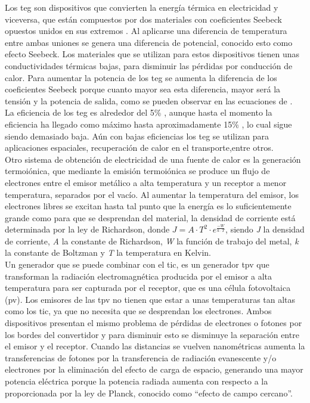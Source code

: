 Los \acrshort{teg} son dispositivos que convierten la energía térmica en electricidad y viceversa, que están compuestos por dos materiales con coeficientes Seebeck opuestos unidos en sus extremos \cite{tegDef1}. Al aplicarse una diferencia de temperatura entre ambas uniones se genera una diferencia de potencial, conocido esto como efecto Seebeck. Los materiales que se utilizan para estos dispositivos tienen unas conductividades térmicas bajas, para disminuir las pérdidas por conducción de calor. Para aumentar la potencia de los \acrshort{teg} se aumenta la diferencia de los coeficientes Seebeck porque cuanto mayor sea esta diferencia, mayor será la tensión y la potencia de salida, como se pueden observar en las ecuaciones de \cite{tegDef1}.\\

La eficiencia de los \acrshort{teg} es alrededor del 5\% \cite{TEG5efficiency}, aunque hasta el momento la eficiencia ha llegado como máximo hasta aproximadamente 15\% \cite{TEG15efficiency}, lo cual sigue siendo demasiado baja. Aún con bajas eficiencias los \acrshort{teg} se utilizan para aplicaciones espaciales, recuperación de calor en el transporte,entre otros.\\


Otro sistema de obtención de electricidad de una fuente de calor es la generación termoiónica, que mediante la emisión termoiónica se produce un flujo de electrones entre el emisor metálico a alta temperatura y un receptor a menor temperatura, separados por el vacío. Al aumentar la temperatura del emisor, los electrones libres se excitan hasta tal punto que la energía es lo suficientemente grande como para que se desprendan del material, la densidad de corriente está determinada por la ley de Richardson, donde $J=A\cdot T^2\cdot e^{\frac{-W}{k\cdot T}}$, siendo \textit{J} la densidad de corriente, \textit{A} la constante de Richardson, \textit{W} la función de trabajo del metal, \textit{k} la constante de Boltzman y \textit{T} la temperatura en Kelvin.\\

Un generador que se puede combinar con el \acrshort{tic}, es un generador \acrshort{tpv} que transforman la radiación electromagnética producida por el emisor a alta temperatura para ser capturada por el receptor, que es una célula fotovoltaica (\acrshort{pv}). Los emisores de las \acrshort{tpv} no tienen que estar a unas temperaturas tan altas como los \acrshort{tic}, ya que no necesita que se desprendan los electrones. Ambos dispositivos presentan el mismo problema de pérdidas de electrones o fotones por los bordes del convertidor y para disminuir esto se disminuye la separación entre el emisor y el receptor. Cuando las distancias se vuelven nanométricas aumenta la transferencias de fotones por la transferencia de radiación evanescente y/o electrones por la eliminación del efecto de carga de espacio, generando una mayor potencia eléctrica porque la potencia radiada aumenta con respecto a la proporcionada por la ley de Planck, conocido como ``efecto de campo cercano''.\\

